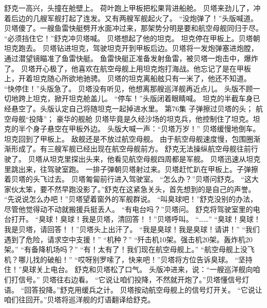 \documentclass[a4paper,12pt,UTF8,twoside]{ctexbook}
\begin{document}
        舒克一高兴，头撞在舱壁上。 
        荷叶跑上甲板把松果背进船舱。 
        贝塔来劲儿了，冲着后边的几艘军舰打起了连发。又有两艘军舰起火了。 
        “没炮弹了！”头版喊道。 
        贝塔傻了。一艘鱼雷快艇劈开水面冲过来，那架势分明是要和航空母舰同归于尽。 
        “必须挡住它！”舒克冲贝塔喊。 
        贝塔想起了他的坦克。 
        坦克停在甲板上。贝塔朝坦克跑去。 
        贝塔钻进坦克，驾驶坦克开到甲板后边。贝塔将一发炮弹塞进炮膛，通过潜望镜瞄准了鱼雷快艇。 
        鱼雷快艇正准备发射鱼雷，被贝塔一炮击中，爆炸了。 
        贝塔开心极了，他喜欢在航空母舰上用坦克炮打海战。他忘记了是在甲板上，开着坦克随心所欲地驰骋。 
        贝塔的坦克离船舷只有一米了，他还不知道。 
        “快停住！”头版急了。 
        贝塔没有听见，他想离那艘巡洋舰再近点儿。 
        头版不顾一切地跨上坦克，掀开坦克舱盖儿。 
        “停车！”头版闭着眼睛喊。 
        坦克的半截车身已经悬空了。头版认定自己将随坦克一起掉进水里。   第76集 
        子弹擦过贝塔的头； 
        航空母舰“投降”； 
        豪华的舰舱   
        贝塔毕竟是久经沙场的坦克兵，他控制住了坦克。坦克的半个身子悬空在甲板外边。 
        头版大喊一声：“贝塔万岁！” 
        贝塔缓慢地倒车。坦克回到了甲板上。 
        敌舰还是不放过航空母舰。 
        由于航空母舰速度慢，包围圈渐渐形成了。有三艘军舰已经出现在航空母舰前方。 
        舒克无法操纵航空母舰往前行驶了。 
        贝塔从坦克里探出头来，他看见航空母舰四周都是军舰。 
        贝塔迅速从坦克里跳出来，往驾驶室跑。 
        一排子弹朝贝塔射过来。贝塔赶忙趴在甲板上。子弹擦着贝塔的头飞过去。 
        贝塔匍匐前行进入驾驶室。 
        “怎么办？”贝塔问舒克。 
        “这大家伙太笨，要不然早跑没影了。”舒克在这紧急关头，首先想到的是自己的声誉。 
        “先说说怎么办吧！”贝塔望着窗外的军舰群说。 
        “叫臭球吧！”舒克没别的办法，尽管他觉得动不动就搬援兵挺丢人。 
        “有电台吗？”贝塔问。 
        舒克将驾驶室里的电台打开。 
        “臭球！臭球！我是贝塔，清回答！！”贝塔呼叫。 
        “……” 
        “臭球！臭球！我是贝塔，请回答！！”贝塔头上出汗了。 
        “我是臭球！我是臭球！请讲！” 
        “我们遇到了危险，请求空中支援！” 
        “机种？” 
        “歼击机10架。强击机20架。轰炸机20架。” 
        “有备降机场吗？” 
        “有！太有了！我们现在航空母舰上。” 
        “航空母舰上没飞机？哪儿找的破船！” 
        “哎呀别罗嗦了，快来吧！”贝塔将方位告诉臭球。 
        “坚持住！”臭球关上电台。 
        舒克和贝塔松了口气。 
        头版冲进来，说：“一艘巡洋舰向咱们打信号。” 
        贝塔往右边看。 
        “它说让咱们投降，不然就开炮了。”贝塔懂信号灯语。 
        “回答投降。”舒克用缓兵之计。 
        贝塔按动航空母舰上的信号灯开关。 
        “它说让咱们往回开。”贝塔将巡洋舰的灯语翻译给舒克。 
\end{document}
